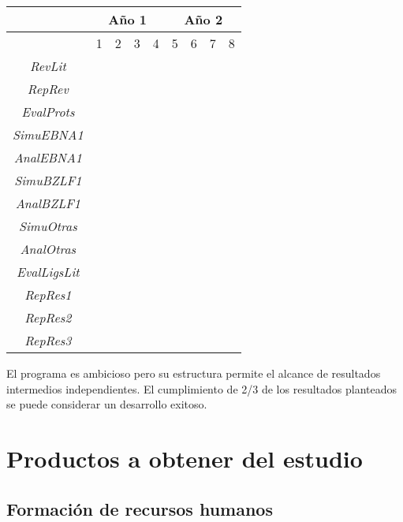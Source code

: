 \documentclass[11pt,letterpaper,titlepage]{article} %
\begin{document}
\begin{table}[!htbp]
	\centering
		\begin{tabular}{|c|c|c|c|c|c|c|c|c|}
      \hline
      &\multicolumn{4}{c|}{Año 1}&\multicolumn{4}{c|}{Año 2}\\
      \hline
		&1&2&3&4&5&6&7&8\\
		\hline
		\emph{RevLit}&\cellcolor{midgray}&&&&&&&\\
		\hline
		\emph{RepRev}&&\cellcolor{midgray}&&&&&&\\
		\hline	
		\emph{EvalProts}&&\cellcolor{midgray}&&&&&&\\
		\hline			
		\emph{SimuEBNA1}&&&\cellcolor{midgray}&\cellcolor{midgray}&&&&\\
		\hline	
		\emph{AnalEBNA1}&&&&\cellcolor{midgray}&\cellcolor{midgray}&&&\\
		\hline
		\emph{SimuBZLF1}&&&&\cellcolor{midgray}&\cellcolor{midgray}&&&\\
		\hline	
		\emph{AnalBZLF1}&&&&&\cellcolor{midgray}&\cellcolor{midgray}&&\\
		\hline	
		\emph{SimuOtras}&&&&&\cellcolor{midgray}&\cellcolor{midgray}&&\\
		\hline	
		\emph{AnalOtras}&&&&&&\cellcolor{midgray}&\cellcolor{midgray}&\\
		\hline	
		\emph{EvalLigsLit}&&&&&&&&\cellcolor{midgray}\\
		\hline	
		\emph{RepRes1}&&&&&\cellcolor{midgray}&\cellcolor{midgray}&&\\
		\hline	
		\emph{RepRes2}&&&&&&\cellcolor{midgray}&\cellcolor{midgray}&\\
		\hline	
		\emph{RepRes3}&&&&&&&\cellcolor{midgray}&\cellcolor{midgray}\\
		\hline	
		\end{tabular}
\end{table}

El programa es ambicioso pero su estructura permite el alcance de resultados
intermedios independientes. El cumplimiento de 2/3 de los resultados planteados
se puede considerar un desarrollo exitoso.

\section{Productos a obtener del estudio}

\subsection{Formación de recursos humanos}
\end{document}
